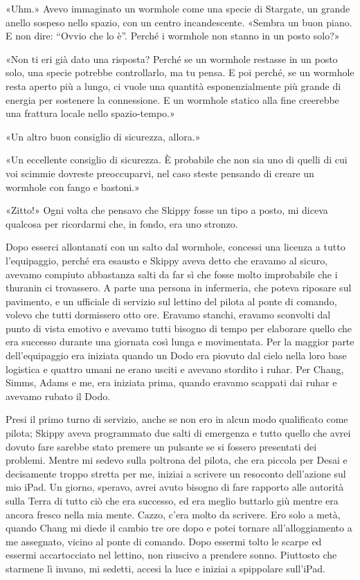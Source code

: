 «Uhm.» Avevo immaginato un wormhole come una specie di Stargate, un
grande anello sospeso nello spazio, con un centro incandescente. «Sembra
un buon piano. E non dire: ``Ovvio che lo è''. Perché i wormhole non
stanno in un posto solo?»

«Non ti eri già dato una risposta? Perché se un wormhole restasse in un
posto solo, una specie potrebbe controllarlo, ma tu pensa. E poi perché,
se un wormhole resta aperto più a lungo, ci vuole una quantità
esponenzialmente più grande di energia per sostenere la connessione. E
un wormhole statico alla fine creerebbe una frattura locale nello
spazio-tempo.»

«Un altro buon consiglio di sicurezza, allora.»

«Un eccellente consiglio di sicurezza. È probabile che non sia uno di
quelli di cui voi scimmie dovreste preoccuparvi, nel caso steste
pensando di creare un wormhole con fango e bastoni.»

«Zitto!» Ogni volta che pensavo che Skippy fosse un tipo a posto, mi
diceva qualcosa per ricordarmi che, in fondo, era uno stronzo.

\hfill\break

Dopo esserci allontanati con un salto dal wormhole, concessi una licenza
a tutto l'equipaggio, perché era esausto e Skippy aveva detto che
eravamo al sicuro, avevamo compiuto abbastanza salti da far sì che fosse
molto improbabile che i thuranin ci trovassero. A parte una persona in
infermeria, che poteva riposare sul pavimento, e un ufficiale di
servizio sul lettino del pilota al ponte di comando, volevo che tutti
dormissero otto ore. Eravamo stanchi, eravamo sconvolti dal punto di
vista emotivo e avevamo tutti bisogno di tempo per elaborare quello che
era successo durante una giornata così lunga e movimentata. Per la
maggior parte dell'equipaggio era iniziata quando un Dodo era piovuto
dal cielo nella loro base logistica e quattro umani ne erano usciti e
avevano stordito i ruhar. Per Chang, Simms, Adams e me, era iniziata
prima, quando eravamo scappati dai ruhar e avevamo rubato il Dodo.

Presi il primo turno di servizio, anche se non ero in alcun modo
qualificato come pilota; Skippy aveva programmato due salti di emergenza
e tutto quello che avrei dovuto fare sarebbe stato premere un pulsante
se si fossero presentati dei problemi. Mentre mi sedevo sulla poltrona
del pilota, che era piccola per Desai e decisamente troppo stretta per
me, iniziai a scrivere un resoconto dell'azione sul mio iPad. Un giorno,
speravo, avrei avuto bisogno di fare rapporto alle autorità sulla Terra
di tutto ciò che era successo, ed era meglio buttarlo giù mentre era
ancora fresco nella mia mente. Cazzo, c'era molto da scrivere. Ero solo
a metà, quando Chang mi diede il cambio tre ore dopo e potei tornare
all'alloggiamento a me assegnato, vicino al ponte di comando. Dopo
essermi tolto le scarpe ed essermi accartocciato nel lettino, non
riuscivo a prendere sonno. Piuttosto che starmene lì invano, mi sedetti,
accesi la luce e iniziai a spippolare sull'iPad.

